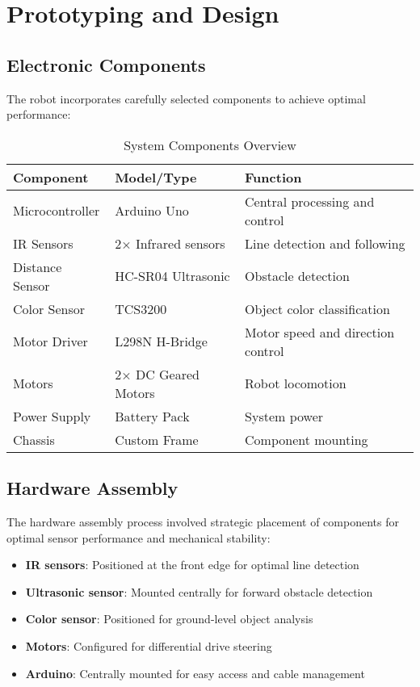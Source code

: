 \documentclass[12pt,a4paper]{article}
\begin{document}
\section{Prototyping and Design}

\subsection{Electronic Components}

The robot incorporates carefully selected components to achieve optimal performance:

\begin{table}[H]
\centering
\begin{tabular}{@{}lll@{}}
\toprule
\textbf{Component} & \textbf{Model/Type} & \textbf{Function} \\
\midrule
Microcontroller & Arduino Uno & Central processing and control \\
IR Sensors & 2× Infrared sensors & Line detection and following \\
Distance Sensor & HC-SR04 Ultrasonic & Obstacle detection \\
Color Sensor & TCS3200 & Object color classification \\
Motor Driver & L298N H-Bridge & Motor speed and direction control \\
Motors & 2× DC Geared Motors & Robot locomotion \\
Power Supply & Battery Pack & System power \\
Chassis & Custom Frame & Component mounting \\
\bottomrule
\end{tabular}
\caption{System Components Overview}
\label{tab:components}
\end{table}

\subsection{Hardware Assembly}

The hardware assembly process involved strategic placement of components for optimal sensor performance and mechanical stability:

\begin{itemize}
    \item \textbf{IR sensors}: Positioned at the front edge for optimal line detection
    \item \textbf{Ultrasonic sensor}: Mounted centrally for forward obstacle detection
    \item \textbf{Color sensor}: Positioned for ground-level object analysis
    \item \textbf{Motors}: Configured for differential drive steering
    \item \textbf{Arduino}: Centrally mounted for easy access and cable management
\end{itemize}
\end{document}
